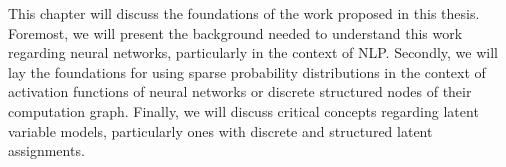 \label{chap:background}

\cleardoublepage
\doublespacing

\noindent This chapter will discuss the foundations of the work proposed in
this thesis. Foremost, we will present the background needed to
understand this work regarding neural networks, particularly in the
context of NLP. Secondly, we will lay the foundations for using
sparse probability distributions in the context of activation
functions of neural networks or discrete structured nodes of their
computation graph. Finally, we will discuss critical concepts
regarding latent variable models, particularly ones with discrete and
structured latent assignments.





\cleardoublepage
\singlespacing
